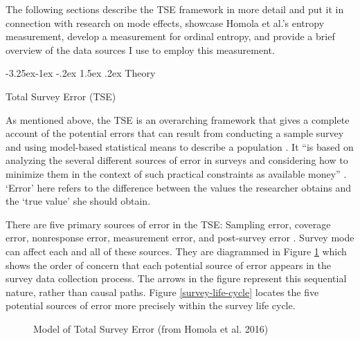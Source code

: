 \documentclass[12pt,]{article}
\makeatletter
\renewcommand\subsection{\@startsection{subsection}{2}{\z@}%
                                     {-3.25ex\@plus -1ex \@minus -.2ex}
                                     {1.5ex \@plus .2ex}
                                     {\normalsize\bfseries}} %
\renewcommand\subsubsection{\@startsection{subsubsection}{3}{\z@}
                                     {-3.25ex\@plus -1ex \@minus -.2ex}
                                     {1.5ex \@plus .2ex}
                                     {\normalsize\itshape}} %
\makeatother
\begin{document}
The following sections describe the TSE framework in more detail and put
it in connection with research on mode effects, showcase Homola et al.'s
entropy measurement, develop a measurement for ordinal entropy, and
provide a brief overview of the data sources I use to employ this
measurement.

\subsection{Theory}\label{mode-theory}

\subsubsection{Total Survey Error (TSE)}\label{mode-theory-tse}

As mentioned above, the TSE is an overarching framework that gives a
complete account of the potential errors that can result from conducting
a sample survey and using model-based statistical means to describe a
population \citep{biemer_2010_overview}. It ``is based on analyzing the
several different sources of error in surveys and considering how to
minimize them in the context of such practical constraints as available
money'' \citep[p.~16]{weisberg_2005_total}. `Error' here refers to the
difference between the values the researcher obtains and the `true
value' she should obtain.

There are five primary sources of error in the TSE: Sampling error,
coverage error, nonresponse error, measurement error, and post-survey
error
\citep{groves_2010_total, groves_survey_2009, weisberg_2005_total}.
Survey mode can affect each and all of these sources. They are
diagrammed in Figure \ref{tse-model} which shows the order of concern
that each potential source of error appears in the survey data
collection process. The arrows in the figure represent this sequential
nature, rather than causal paths. Figure \ref{survey-life-cycle} locates
the five potential sources of error more precisely within the survey
life cycle.

\vspace{0.4cm}

\begin{figure}[H]
\centering
{}
\caption{Model of Total Survey Error (from Homola et al. 2016)} \label{tse-model}
\end{figure}
\end{document}
